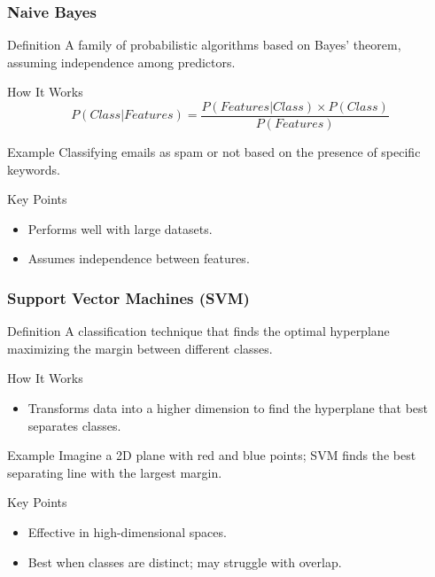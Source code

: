\documentclass[aspectratio=169]{beamer}
\begin{document}
\begin{frame}[fragile]
    \frametitle{Naive Bayes}
    \begin{block}{Definition}
        A family of probabilistic algorithms based on Bayes' theorem, assuming independence among predictors.
    \end{block}

    \begin{block}{How It Works}
        \begin{equation}
            P(Class|Features) = \frac{P(Features|Class) \times P(Class)}{P(Features)}
        \end{equation}
    \end{block}

    \begin{block}{Example}
        Classifying emails as spam or not based on the presence of specific keywords.
    \end{block}

    \begin{block}{Key Points}
        \begin{itemize}
            \item Performs well with large datasets.
            \item Assumes independence between features.
        \end{itemize}
    \end{block}
\end{frame}

\begin{frame}[fragile]
    \frametitle{Support Vector Machines (SVM)}
    \begin{block}{Definition}
        A classification technique that finds the optimal hyperplane maximizing the margin between different classes.
    \end{block}

    \begin{block}{How It Works}
        \begin{itemize}
            \item Transforms data into a higher dimension to find the hyperplane that best separates classes.
        \end{itemize}
    \end{block}

    \begin{block}{Example}
        Imagine a 2D plane with red and blue points; SVM finds the best separating line with the largest margin.
    \end{block}
    
    \begin{block}{Key Points}
        \begin{itemize}
            \item Effective in high-dimensional spaces.
            \item Best when classes are distinct; may struggle with overlap.
        \end{itemize}
    \end{block}
\end{frame}
\end{document}
